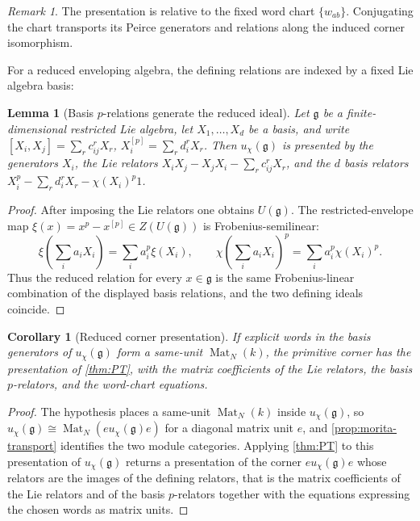 \documentclass[11pt,reqno]{amsart}
\newtheorem{lemma}[lemma]{Lemma}
\newtheorem{corollary}[corollary]{Corollary}
\theoremstyle{definition}
\theoremstyle{remark}
\newtheorem{remark}[remark]{Remark}
\theoremstyle{definition}
\newcommand{\Mat}{\operatorname{Mat}}
\begin{document}
\begin{remark}
The presentation is relative to the fixed word chart $\{w_{ab}\}$.
Conjugating the chart transports its Peirce generators and relations
along the induced corner isomorphism.
\end{remark}

For a reduced enveloping algebra, the defining relations are indexed
by a fixed Lie algebra basis:

\begin{lemma}[Basis $p$-relations generate the reduced ideal]
\label{lem:p-relations}
Let $\mathfrak g$ be a finite-dimensional restricted Lie algebra, let
$X_1,\ldots,X_d$ be a basis, and write
$[X_i,X_j]=\sum_rc_{ij}^rX_r$, $X_i^{[p]}=\sum_rd_i^rX_r$.  Then
$u_\chi(\mathfrak g)$ is presented by the generators $X_i$, the Lie
relators $X_iX_j-X_jX_i-\sum_rc_{ij}^rX_r$, and the $d$ basis relators
$X_i^p-\sum_rd_i^rX_r-\chi(X_i)^p1$.
\end{lemma}

\begin{proof}
After imposing the Lie relators one obtains $U(\mathfrak g)$.  The
restricted-envelope map
$\xi(x)=x^p-x^{[p]}\in Z(U(\mathfrak g))$ is Frobenius-semilinear:
\[
 \xi\!\left(\sum_i a_iX_i\right)=\sum_i a_i^p\xi(X_i),
 \qquad
 \chi\!\left(\sum_i a_iX_i\right)^p=\sum_i a_i^p\chi(X_i)^p.
\]
Thus the reduced relation for every $x\in\mathfrak g$ is the same
Frobenius-linear combination of the displayed basis relations, and the two
defining ideals coincide.
\end{proof}

\begin{corollary}[Reduced corner presentation]\label{cor:reduced-corner}
If explicit words in the basis generators of $u_\chi(\mathfrak g)$ form a
same-unit $\Mat_N(k)$, the primitive corner has the presentation of
\cref{thm:PT}, with the matrix coefficients of the Lie relators, the basis
$p$-relators, and the word-chart equations.
\end{corollary}

\begin{proof}
The hypothesis places a same-unit $\Mat_N(k)$ inside
$u_\chi(\mathfrak g)$, so $u_\chi(\mathfrak g)\cong\Mat_N(eu_\chi(\mathfrak
g)e)$ for a diagonal matrix unit $e$, and
\cref{prop:morita-transport} identifies the two module categories.  Applying
\cref{thm:PT} to this presentation of $u_\chi(\mathfrak g)$ returns a
presentation of the corner $eu_\chi(\mathfrak g)e$ whose relators are the
images of the defining relators, that is the matrix coefficients of the Lie
relators and of the basis $p$-relators together with the equations
expressing the chosen words as matrix units.
\end{proof}
\end{document}
